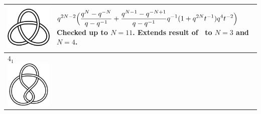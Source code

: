 \documentclass{compositio}
\theoremstyle{definition}
\numberwithin{equation}{section}
\begin{document}
{\begin{longtable}{p{}|p{}}
\includegraphics[scale=0.07,angle=0]{knot3_1.pdf} 
& 
$
\displaystyle{%
q^{2N-2} \Big( \frac{q^N-q^{-N}}{q-q^{-1}} + \frac{q^{N-1}-q^{-N+1}}{q-q^{-1}} q^{-1} (1 + q^{2N} t^{-1}) q^{4} t^{-2} \Big)
}
$
\newline\newline\newline\newline
Checked up to $N=11$. Extends result of~\cite{r0508510} to $N=3$ and $N=4$. 
\\
\hline
$4_{1}$ 
\includegraphics[scale=0.07,angle=0]{knot4_1.pdf} 

\end{longtable}}
\end{document}
